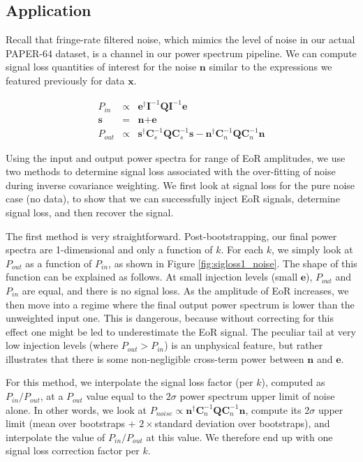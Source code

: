 \documentclass[preprint2,numberedappendix,tighten,twocolappendix]{aastex6}  %
\begin{document}
\subsection{Application}
\label{sec:siglossprac}

Recall that fringe-rate filtered noise, which mimics the level of noise in our actual PAPER-64 dataset, is a channel in our power spectrum pipeline. We can compute signal loss quantities of interest for the noise $\textbf{n}$ similar to the expressions we featured previously for data $\textbf{x}$. 

\begin{eqnarray}
P_{in} &\propto& \textbf{e}^{\dagger}\textbf{I}^{-1}\textbf{Q}\textbf{I}^{-1}\textbf{e} \\
\textbf{s} &=& \textbf{n} + \textbf{e} \\
P_{out} &\propto& \textbf{s}^{\dagger}\textbf{C}_{s}^{-1}\textbf{Q}\textbf{C}_{s}^{-1}\textbf{s} - \textbf{n}^{\dagger}\textbf{C}_{n}^{-1}\textbf{Q}\textbf{C}_{n}^{-1}\textbf{n} 
\end{eqnarray}

Using the input and output power spectra for range of EoR amplitudes, we use two methods to determine signal loss associated with the over-fitting of noise during inverse covariance weighting. We first look at signal loss for the pure noise case (no data), to show that we can successfully inject EoR signals, determine signal loss, and then recover the signal.

The first method is very straightforward. Post-bootstrapping, our final power spectra are 1-dimensional and only a function of $k$. For each $k$, we simply look at $P_{out}$ as a function of $P_{in}$, as shown in Figure \ref{fig:sigloss1_noise}. The shape of this function can be explained as follows. At small injection levels (small $\textbf{e}$), $P_{out}$ and $P_{in}$ are equal, and there is no signal loss. As the amplitude of EoR increases, we then move into a regime where the final output power spectrum is lower than the unweighted input one. This is dangerous, because without correcting for this effect one might be led to underestimate the EoR signal. The peculiar tail at very low injection levels (where $P_{out} > P_{in}$) is an unphysical feature, but rather illustrates that there is some non-negligible cross-term power between $\textbf{n}$ and $\textbf{e}$.

For this method, we interpolate the signal loss factor (per $k$), computed as $P_{in}/P_{out}$, at a $P_{out}$ value equal to the $2\sigma$ power spectrum upper limit of noise alone. In other words, we look at $P_{noise} \propto \textbf{n}^{\dagger}\textbf{C}_{n}^{-1}\textbf{Q}\textbf{C}_{n}^{-1}\textbf{n}$, compute its $2\sigma$ upper limit (mean over bootstraps + $2 \times $standard deviation over bootstraps), and interpolate the value of $P_{in}/P_{out}$ at this value. We therefore end up with one signal loss correction factor per $k$. 
\end{document}

